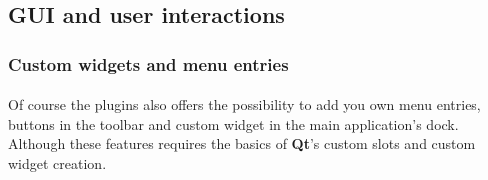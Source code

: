 \documentclass[a4paper]{scrreprt}
\begin{document}
\subsection{GUI and user interactions}
	\subsubsection{Custom widgets and menu entries}
	\paragraph{}
	Of course the plugins also offers the possibility to add you own menu entries,
	buttons in the toolbar and custom widget in the main application's dock.
	Although these features requires the basics of \textbf{Qt}'s custom slots and
	custom widget creation.
	
\end{document}
